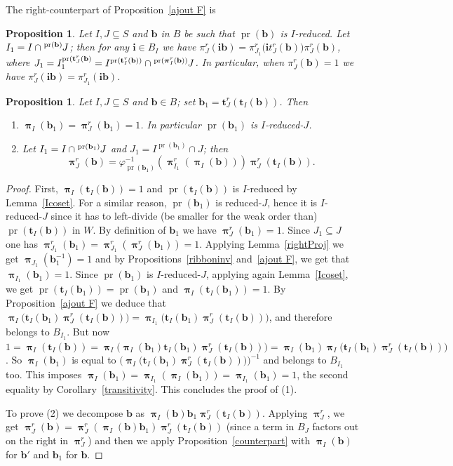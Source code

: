 \documentclass{amsart}
\numberwithin{equation}{section}
\newtheorem{proposition}[equation]{Proposition}
\newcommand\lexp[2]{\kern\scriptspace\vphantom{#2}^{#1}\kern-\scriptspace#2}
\newcommand\inv{^{-1}}
\newcommand\bb{{\mathbf b}}
\newcommand\bi{{\mathbf i}}
\newcommand\bt{{\mathbf t}}
\DeclareMathOperator\pr{pr}
\DeclareMathOperator\bpi{\boldsymbol\pi}
\begin{document}
The right-counterpart of Proposition~\ref{ajout F} is
\begin{proposition} \label{pi_I(rb)V2modif} Let $I,J\subseteq S$ and $\bb$ in
$B$ be such
that $\pr(\bb)$ is  $I$-reduced.   Let $I_1=I\cap \lexp{\pr(\bb)}J$; then
for any $\bi\in B_I$ we have $\pi^r_J(\bi\bb) =   \pi^r_{J_1}\big(\bi
t_J^r(\bb)\big) \pi^r_J(\bb)$, where
$J_1=I_1^{\pr(\bt_J^r(\bb)}=I^{\pr(\bt^r_I(\bb))}\cap \lexp{\pr(\bpi^r_I(\bb))}J$.
In particular, when $\pi^r_J(\bb) = 1$ we have
$\pi^r_J(\bi\bb) = \pi^r_{J_1}(\bi \bb)$. 
\end{proposition}

\begin{proposition}\label{prepdbcoset}Let $I,J\subseteq S$ and $\bb\in B$;
set $\bb_1 = \bt^r_J(\bt_I(\bb))$.  Then 
\begin{enumerate}
\item $\bpi_I(\bb_1)=\bpi^r_J(\bb_1)=1$. In particular $\pr(\bb_1)$ is $I$-reduced-$J$.
\item  Let $I_1= I\cap\lexp{\pr(\bb_1)}J$ and $J_1=I^{\pr(\bb_1)}\cap J$;
then 
$$\bpi^r_J(\bb)=\varphi\inv_{\pr(\bb_1)}(\bpi^r_{I_1}(\bpi_I(\bb)))\bpi^r_J(\bt_I(\bb)).$$
\end{enumerate}
\end{proposition}
\begin{proof}
 First,  $\bpi_I(\bt_I(\bb)) = 1$ and
$\pr(\bt_I(\bb))$ is $I$-reduced by Lemma~\ref{Icoset}. For a similar reason,
$\pr(\bb_1)$ is reduced-$J$, hence it is  $I$-reduced-$J$ since it
has to left-divide (be smaller for the weak order than) 
$\pr(\bt_I(\bb))$ in $W$.  By definition of $\bb_1$ we have
$\bpi^r_J(\bb_1)=1$.
Since $J_1\subseteq J$ one has
$\bpi^r_{J_1}(\bb_1) = \bpi^r_{J_1}(\bpi^r_J(\bb_1))= 1$. Applying 
Lemma~\ref{rightProj} we get
 $\bpi_{J_1}(\bb_1^{-1}) = 1$ and by Propositions~\ref{ribboninv} and~\ref{ajout F}, we get that
 $\bpi_{I_1}(\bb_1) = 1$. Since $\pr(\bb_1)$ is $I$-reduced-$J$, applying
 again Lemma~\ref{Icoset}, we get $\pr(\bt_I(\bb_1)) = \pr(\bb_1)$ and
 $\bpi_I(\bt_I(\bb_1)) = 1$. By Proposition~\ref{ajout F} we deduce
 that $\bpi_I\big(\bt_I(\bb_1)\bpi_J^r(\bt_I(\bb))\big) =
 \bpi_{I_1}\big(\bt_I(\bb_1)\bpi_J^r(\bt_I(\bb))\big)$, and therefore belongs to
 $B_{I_1}$.  But now $1 = \bpi_I(\bt_I(\bb)) =
\bpi_I\big(\bpi_I(\bb_1)\bt_I(\bb_1)\bpi_J^r(\bt_I(\bb))\big) = \bpi_I(\bb_1)
\bpi_I\big(\bt_I(\bb_1)\bpi_J^r(\bt_I(\bb))\big)$. So $\bpi_I(\bb_1)$ is equal to
$\big(\bpi_I\big(\bt_I(\bb_1)\bpi_J^r(\bt_I(\bb))\big)\big)^{-1}$ and belongs to $B_{I_1}$ too. This imposes
$\bpi_I(\bb_1)  = \bpi_{I_1}(\bpi_I(\bb_1))=\bpi_{I_1}(\bb_1)=1$, the second
equality by Corollary~\ref{transitivity}.
This concludes the proof of (1).

To prove (2) we decompose $\bb$ as $\bpi_I(\bb)\bb_1\bpi_J^r(\bt_I(\bb))$.
 Applying $\bpi^r_J$, we get
$\bpi_J^r(\bb)=\bpi_J^r(\bpi_I(\bb)\bb_1)\bpi_J^r(\bt_I(\bb))$  (since a  term
 in $B_J$  factors  out  on  the  right  in  $\bpi_J^r$)  and  then we apply
Proposition~\ref{counterpart}  with  $\bpi_I(\bb)$  for $\bb'$ and
$\bb_1$ for $\bb$.
\end{proof}
\end{document}
